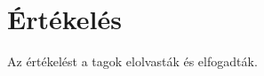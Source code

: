 \section{Értékelés}

Az értékelést a tagok elolvasták és elfogadták.

\begin{ertekeles}
\end{ertekeles}


